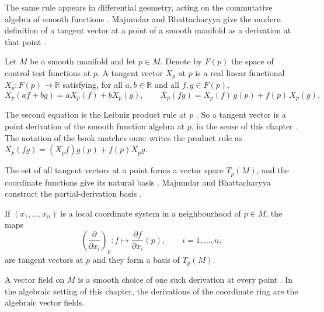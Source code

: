 The same rule appears in differential geometry, acting on the commutative
algebra of smooth functions \cite[p.~70]{MajumdarBhattacharyya2023}. Majumdar
and Bhattacharyya give the modern definition of a tangent vector at a point of
a smooth manifold as a derivation at that point
\cite{MajumdarBhattacharyya2023}.

\begin{definition}\label{def:comm:tangent-derivation}
Let $M$ be a smooth manifold and let $p\in M$. Denote by $F(p)$ the space of control
test functions at $p$. A tangent vector $X_p$ at $p$ is a real linear functional
$X_p\colon F(p)\to\mathbb{R}$ satisfying, for all $a,b\in\mathbb{R}$ and all
$f,g\in F(p)$,
\[
X_p(af+bg) = a X_p(f) + b X_p(g),\qquad
X_p(fg) = X_p(f)\,g(p) + f(p)\,X_p(g).
\]
\end{definition}

The second equation is the Leibniz product rule at $p$ \cite[equation (2.17),
p.~70]{MajumdarBhattacharyya2023}. So a tangent vector is a point derivation
of the smooth function algebra at $p$, in the sense of this chapter
\cite[equation (2.17), p.~70]{MajumdarBhattacharyya2023}. The notation of the
book matches ours: \cite[equation (2.17), p.~70]{MajumdarBhattacharyya2023}
writes the product rule as $X_p(fg)=(X_p f)g(p)+f(p)X_p g$.

The set of all tangent vectors at a point forms a vector space $T_p(M)$, and
the coordinate functions give its natural basis \cite[equation (2.19),
p.~70]{MajumdarBhattacharyya2023}. Majumdar and Bhattacharyya construct the
partial-derivation basis \cite[equation (2.19),
p.~70]{MajumdarBhattacharyya2023}.

\begin{definition}\label{def:comm:coordinate-basis}
If $(x_1,\dots,x_n)$ is a local coordinate system in a neighbourhood of $p\in M$, the maps
\[
\left(\frac{\partial}{\partial x_i}\right)_p\colon f\longmapsto
\frac{\partial f}{\partial x_i}(p),\qquad i=1,\dots,n,
\]
are tangent vectors at $p$ and they form a basis of $T_p(M)$.
\end{definition}

A vector field on $M$ is a smooth choice of one such derivation at every point
\cite[p.~70]{MajumdarBhattacharyya2023}. In the algebraic setting of this
chapter, the derivations of the coordinate ring are the algebraic vector
fields.

